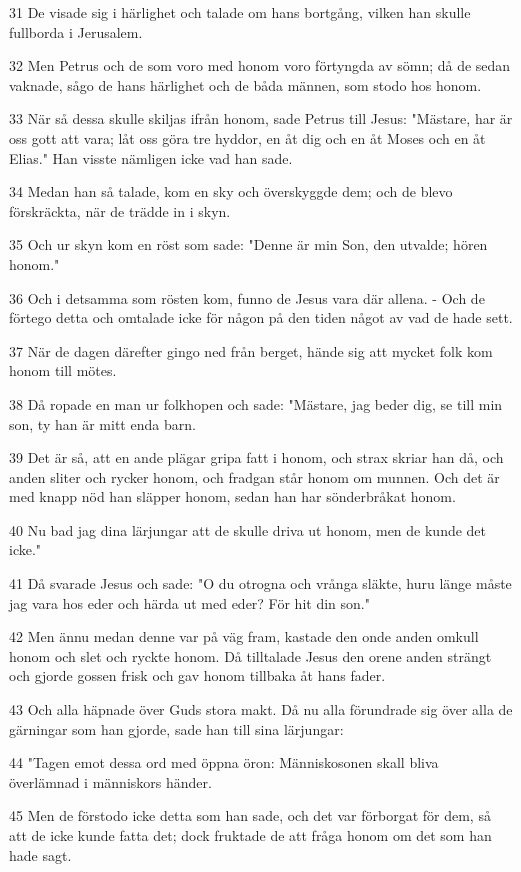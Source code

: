 \par 31 De visade sig i härlighet och talade om hans bortgång, vilken han skulle fullborda i Jerusalem.
\par 32 Men Petrus och de som voro med honom voro förtyngda av sömn; då de sedan vaknade, sågo de hans härlighet och de båda männen, som stodo hos honom.
\par 33 När så dessa skulle skiljas ifrån honom, sade Petrus till Jesus: "Mästare, har är oss gott att vara; låt oss göra tre hyddor, en åt dig och en åt Moses och en åt Elias." Han visste nämligen icke vad han sade.
\par 34 Medan han så talade, kom en sky och överskyggde dem; och de blevo förskräckta, när de trädde in i skyn.
\par 35 Och ur skyn kom en röst som sade: "Denne är min Son, den utvalde; hören honom."
\par 36 Och i detsamma som rösten kom, funno de Jesus vara där allena. - Och de förtego detta och omtalade icke för någon på den tiden något av vad de hade sett.
\par 37 När de dagen därefter gingo ned från berget, hände sig att mycket folk kom honom till mötes.
\par 38 Då ropade en man ur folkhopen och sade: "Mästare, jag beder dig, se till min son, ty han är mitt enda barn.
\par 39 Det är så, att en ande plägar gripa fatt i honom, och strax skriar han då, och anden sliter och rycker honom, och fradgan står honom om munnen. Och det är med knapp nöd han släpper honom, sedan han har sönderbråkat honom.
\par 40 Nu bad jag dina lärjungar att de skulle driva ut honom, men de kunde det icke."
\par 41 Då svarade Jesus och sade: "O du otrogna och vrånga släkte, huru länge måste jag vara hos eder och härda ut med eder? För hit din son."
\par 42 Men ännu medan denne var på väg fram, kastade den onde anden omkull honom och slet och ryckte honom. Då tilltalade Jesus den orene anden strängt och gjorde gossen frisk och gav honom tillbaka åt hans fader.
\par 43 Och alla häpnade över Guds stora makt. Då nu alla förundrade sig över alla de gärningar som han gjorde, sade han till sina lärjungar:
\par 44 "Tagen emot dessa ord med öppna öron: Människosonen skall bliva överlämnad i människors händer.
\par 45 Men de förstodo icke detta som han sade, och det var förborgat för dem, så att de icke kunde fatta det; dock fruktade de att fråga honom om det som han hade sagt.
